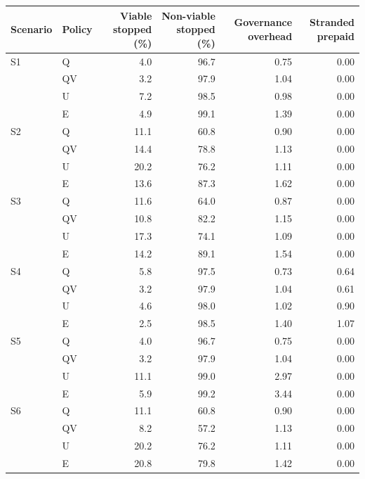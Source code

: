 \begin{tabular}{@{}llrrrr@{}}
\toprule
Scenario & Policy & Viable stopped (\%) & Non-viable stopped (\%) & Governance overhead & Stranded prepaid \\
\midrule
S1 & Q & 4.0 & 96.7 & 0.75 & 0.00 \\
 & QV & 3.2 & 97.9 & 1.04 & 0.00 \\
 & U & 7.2 & 98.5 & 0.98 & 0.00 \\
 & E & 4.9 & 99.1 & 1.39 & 0.00 \\
\addlinespace[2pt]
S2 & Q & 11.1 & 60.8 & 0.90 & 0.00 \\
 & QV & 14.4 & 78.8 & 1.13 & 0.00 \\
 & U & 20.2 & 76.2 & 1.11 & 0.00 \\
 & E & 13.6 & 87.3 & 1.62 & 0.00 \\
\addlinespace[2pt]
S3 & Q & 11.6 & 64.0 & 0.87 & 0.00 \\
 & QV & 10.8 & 82.2 & 1.15 & 0.00 \\
 & U & 17.3 & 74.1 & 1.09 & 0.00 \\
 & E & 14.2 & 89.1 & 1.54 & 0.00 \\
\addlinespace[2pt]
S4 & Q & 5.8 & 97.5 & 0.73 & 0.64 \\
 & QV & 3.2 & 97.9 & 1.04 & 0.61 \\
 & U & 4.6 & 98.0 & 1.02 & 0.90 \\
 & E & 2.5 & 98.5 & 1.40 & 1.07 \\
\addlinespace[2pt]
S5 & Q & 4.0 & 96.7 & 0.75 & 0.00 \\
 & QV & 3.2 & 97.9 & 1.04 & 0.00 \\
 & U & 11.1 & 99.0 & 2.97 & 0.00 \\
 & E & 5.9 & 99.2 & 3.44 & 0.00 \\
\addlinespace[2pt]
S6 & Q & 11.1 & 60.8 & 0.90 & 0.00 \\
 & QV & 8.2 & 57.2 & 1.13 & 0.00 \\
 & U & 20.2 & 76.2 & 1.11 & 0.00 \\
 & E & 20.8 & 79.8 & 1.42 & 0.00 \\
\bottomrule
\end{tabular}